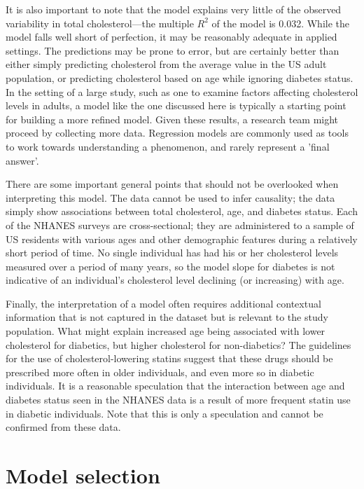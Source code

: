It is also important to note that the model explains very little of the observed variability in total cholesterol---the multiple $R^2$ of the model is 0.032. While the model falls well short of perfection, it may be reasonably adequate in applied settings. The predictions may be prone to error, but are certainly better than either simply predicting cholesterol from the average value in the US adult population, or predicting cholesterol based on age while ignoring diabetes status. In the setting of a large study, such as one to examine factors affecting cholesterol levels in adults, a model like the one discussed here is typically a starting point for building a more refined model. Given these results, a research team might proceed by collecting more data. Regression models are commonly used as tools to work towards understanding a phenomenon, and rarely represent a 'final answer'.

There are some important general points that should not be overlooked when interpreting this model. The data cannot be used to infer causality; the data simply show associations between total cholesterol, age, and diabetes status. Each of the NHANES surveys are cross-sectional; they are administered to a sample of US residents with various ages and other demographic features during a relatively short period of time.  No single individual has had his or her cholesterol levels measured over a period of many years, so the model slope for diabetes is not indicative of an individual's cholesterol level declining (or increasing) with age.

Finally, the interpretation of a model often requires additional contextual information that is not captured in the dataset but is relevant to the study population. What might explain increased age being associated with lower cholesterol for diabetics, but higher cholesterol for non-diabetics? The guidelines for the use of cholesterol-lowering statins suggest that these drugs should be prescribed more often in older individuals, and even more so in diabetic individuals. It is a reasonable speculation that the interaction between age and diabetes status seen in the NHANES data is a result of more frequent statin use in diabetic individuals. Note that this is only a speculation and cannot be confirmed from these data.

\section{Model selection}
\label{modelSelection}


